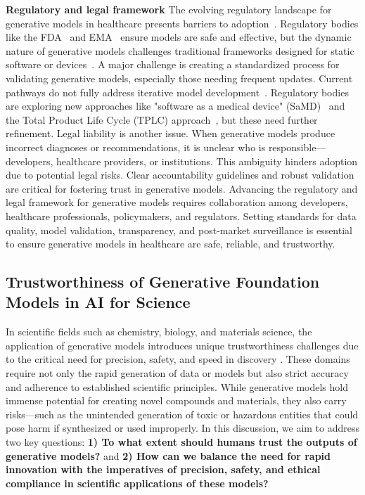 \textbf{Regulatory and legal framework} The evolving regulatory landscape for generative models in healthcare presents barriers to adoption~\cite{rieke2020future,beam2018big}. Regulatory bodies like the FDA~\cite{food2021artificial} and EMA~\cite{fraser2018need} ensure models are safe and effective, but the dynamic nature of generative models challenges traditional frameworks designed for static software or devices~\cite{muehlematter2021approval}. A major challenge is creating a standardized process for validating generative models, especially those needing frequent updates. Current pathways do not fully address iterative model development~\cite{wu2021medical}. Regulatory bodies are exploring new approaches like "software as a medical device" (SaMD)~\cite{food2019proposed} and the Total Product Life Cycle (TPLC) approach~\cite{hwang2016study}, but these need further refinement. Legal liability is another issue. When generative models produce incorrect diagnoses or recommendations, it is unclear who is responsible—developers, healthcare providers, or institutions. This ambiguity hinders adoption due to potential legal risks. Clear accountability guidelines and robust validation are critical for fostering trust in generative models. Advancing the regulatory and legal framework for generative models requires collaboration among developers, healthcare professionals, policymakers, and regulators. Setting standards for data quality, model validation, transparency, and post-market surveillance is essential to ensure generative models in healthcare are safe, reliable, and trustworthy.

 \subsection{Trustworthiness of Generative Foundation Models in AI for Science}
In scientific fields such as chemistry, biology, and materials science, the application of generative models introduces unique trustworthiness challenges due to the critical need for precision, safety, and speed in discovery \cite{fan2023trustworthiness,messeri2024artificial,he2023control,zhang2023survey}. These domains require not only the rapid generation of data or models but also strict accuracy and adherence to established scientific principles. While generative models hold immense potential for creating novel compounds and materials, they also carry risks—such as the unintended generation of toxic or hazardous entities that could pose harm if synthesized or used improperly. In this discussion, we aim to address two key questions: \textbf{1) To what extent should humans trust the outputs of generative models?} and \textbf{2) How can we balance the need for rapid innovation with the imperatives of precision, safety, and ethical compliance in scientific applications of these models?}

